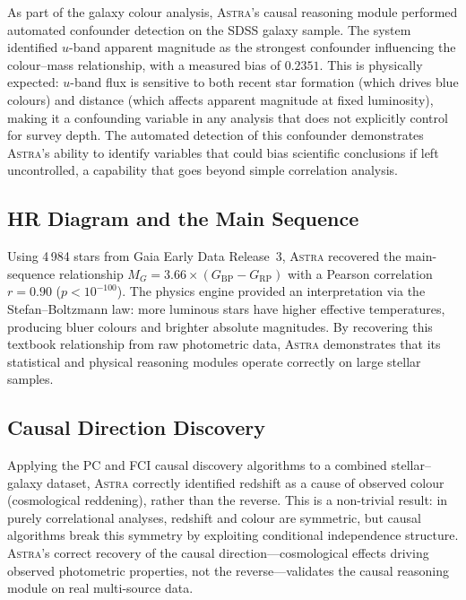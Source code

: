 \documentclass[usenatbib]{rasti}
\newcommand{\astra}{\textsc{Astra}\xspace}
\newcommand{\pc}{PC\xspace}
\newcommand{\fci}{FCI\xspace}
\begin{document}
As part of the galaxy colour analysis, \astra's causal reasoning module performed automated confounder detection on the SDSS galaxy sample.
The system identified $u$-band apparent magnitude as the strongest confounder influencing the colour--mass relationship, with a measured bias of $0.2351$.
This is physically expected: $u$-band flux is sensitive to both recent star formation (which drives blue colours) and distance (which affects apparent magnitude at fixed luminosity), making it a confounding variable in any analysis that does not explicitly control for survey depth.
The automated detection of this confounder demonstrates \astra's ability to identify variables that could bias scientific conclusions if left uncontrolled, a capability that goes beyond simple correlation analysis.

\subsection{HR Diagram and the Main Sequence}
\label{sec:live:hr}

Using 4\,984 stars from Gaia Early Data Release~3, \astra recovered the main-sequence relationship $M_{G} = 3.66 \times (G_{\mathrm{BP}} - G_{\mathrm{RP}})$ with a Pearson correlation $r = 0.90$ ($p < 10^{-100}$).
The physics engine provided an interpretation via the Stefan--Boltzmann law: more luminous stars have higher effective temperatures, producing bluer colours and brighter absolute magnitudes.
By recovering this textbook relationship from raw photometric data, \astra demonstrates that its statistical and physical reasoning modules operate correctly on large stellar samples.

\subsection{Causal Direction Discovery}
\label{sec:live:causal}

Applying the \pc and \fci \citep{Zhang2008} causal discovery algorithms to a combined stellar--galaxy dataset, \astra correctly identified redshift as a cause of observed colour (cosmological reddening), rather than the reverse.
This is a non-trivial result: in purely correlational analyses, redshift and colour are symmetric, but causal algorithms break this symmetry by exploiting conditional independence structure.
\astra's correct recovery of the causal direction---cosmological effects driving observed photometric properties, not the reverse---validates the causal reasoning module on real multi-source data.
\end{document}
